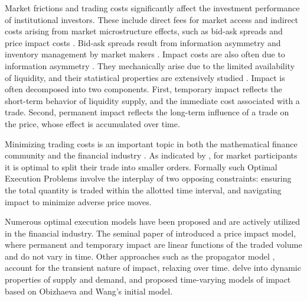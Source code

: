 \documentclass[final,3p,authoryear,12pt]{elsarticle}
\begin{document}
Market frictions and trading costs significantly affect the investment performance of institutional investors. These include direct fees for market access and indirect costs arising from market microstructure effects, such as bid-ask spreads and price impact costs \cite{bouchaud2009markets, cont2014price}. Bid-ask spreads result from information asymmetry and inventory management by market makers \cite{glosten1985bid}. Impact costs are also often due to information asymmetry \cite{kyle1985continuous}. They mechanically arise due to the limited availability of liquidity, and their statistical properties are extensively studied \cite{lillo2003master, bouchaud2009markets, bucci2020co, zarinelli2015beyond}. Impact is often decomposed into two components. First, temporary impact reflects the short-term behavior of liquidity supply, and the immediate cost associated with a trade. Second, permanent impact reflects the long-term influence of a trade on the price, whose effect is accumulated over time.

Minimizing trading costs is an important topic in both the mathematical finance community and the financial industry \cite{bouchaud2009markets, taranto2018linear, obizhaeva2013optimal, almgren2001optimal, fruth2014optimal, fruth2019optimal}. As indicated by  \cite{kyle1985continuous}, for market participants it is optimal to split their trade into smaller orders. Formally such Optimal Execution Problems involve the interplay of two opposing constraints: ensuring the total quantity is traded within the allotted time interval, and navigating impact to minimize adverse price moves.

Numerous optimal execution models have been proposed and are actively utilized in the financial industry. The seminal paper of \cite{almgren2001optimal} introduced a price impact model, where permanent and temporary impact are linear functions of the traded volume and do not vary in time. Other approaches such as the propagator model \cite{bouchaud2003fluctuations}, account for the transient nature of impact, relaxing over time. \cite{obizhaeva2013optimal} delve into dynamic properties of supply and demand, and  \cite{fruth2014optimal} proposed time-varying models of impact based on Obizhaeva and Wang's initial model. 
\end{document}
